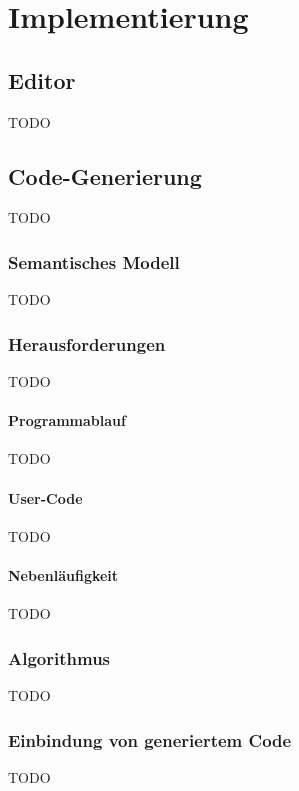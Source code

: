 \chapter{Implementierung}
\label{chap:Implementierung}

\section{Editor}
\label{sec:Editor}
TODO

\section{Code-Generierung}
TODO

\subsection{Semantisches Modell}
TODO

\subsection{Herausforderungen}
TODO

\subsubsection{Programmablauf}
TODO

\subsubsection{User-Code}
TODO

\subsubsection{Nebenläufigkeit}
TODO

\subsection{Algorithmus}
TODO

\subsection{Einbindung von generiertem Code}
TODO